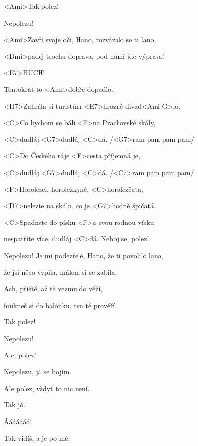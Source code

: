 

\rec
<Ami>Tak polez!

Nepolezu!

\zs
<Ami>Zavři svoje oči, Hano, rozvázalo se ti lano,

<Dmi>padej trochu doprava, pod námi jde výprava!

<E7>BUCH!

Tentokrát to <Ami>dobře dopadlo.

<H7>Zahrála si turistům <E7>hrozné divad<Ami G>lo. \ks

\zr
<C>Co bychom se báli <F>na Prachovské skály,

<C>dudláj <G7>dudláj <C>dá. /<G7>ram pam pam pam/

<C>Do Českého ráje <F>cesta příjemná je,

<C>dudláj <G7>dudláj <C>dá. /<C7>ram pam pam pam/

<F>Horolezci, horolezkyně, <C>horolezčata,

<D7>nelezte na skálu, co je <G7>hodně špičatá.

<C>Spadnete do písku <F>a svou rodnou vísku

nespatříte více, dudláj <C>dá.
\rec
Neboj se, polez!

Nepolezu!
\zs
Je mi podezřelé, Hano, že ti povolilo lano,

že jsi něco vypila, málem si se zabila.

Ach, příště, až tě vezmu do věží,

foukneš si do balónku, ten tě prověří.
\ks

\rec
Tak polez!

Nepolezu!

Ale, polez!

Nepolezu, já se bojím.

Ale polez, vždyť to nic není.

Tak jó.

Ááááááá!

Tak vidíš, a je po mě.

\kp
